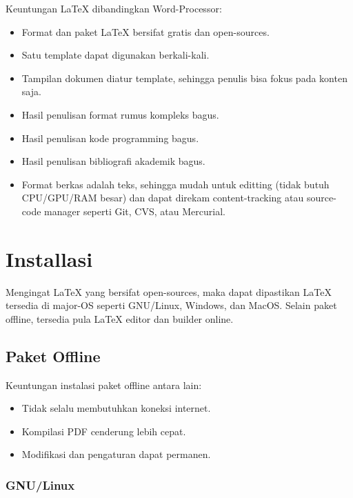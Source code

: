 \documentclass{book} %
\begin{document}
    Keuntungan \LaTeX{} dibandingkan Word-Processor:
    \begin{itemize}
    	\item Format dan paket \LaTeX{} bersifat gratis dan open-sources.
        \item Satu template dapat digunakan berkali-kali.
        \item Tampilan dokumen diatur template, sehingga penulis bisa fokus pada konten saja.
        \item Hasil penulisan format rumus kompleks bagus.
        \item Hasil penulisan kode programming bagus.
        \item Hasil penulisan bibliografi akademik bagus.
        \item Format berkas adalah teks, sehingga mudah untuk editting (tidak butuh CPU/GPU/RAM besar)
        dan dapat direkam content-tracking atau source-code manager seperti Git, CVS, atau Mercurial.
    \end{itemize}


	\chapter{Installasi}

	Mengingat \LaTeX{} yang bersifat open-sources, maka dapat dipastikan \LaTeX{} tersedia di major-OS seperti GNU/Linux, Windows, dan MacOS.
	Selain paket offline, tersedia pula \LaTeX{} editor dan builder online.

	\section{Paket Offline}

	Keuntungan instalasi paket offline antara lain:

	\begin{itemize}
		\item Tidak selalu membutuhkan koneksi internet.
		\item Kompilasi PDF cenderung lebih cepat.
		\item Modifikasi dan pengaturan dapat permanen.
	\end{itemize}

	\subsection{GNU/Linux}
\end{document}

